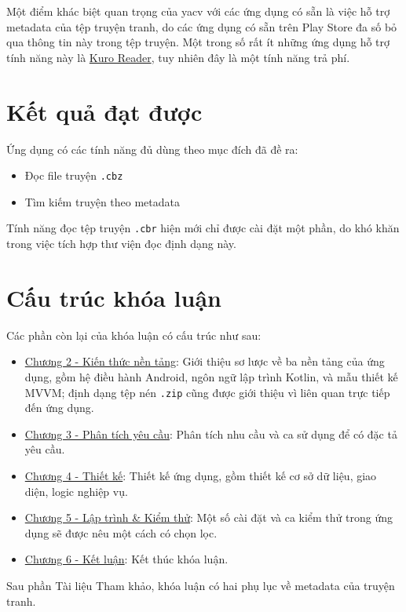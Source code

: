 \documentclass[../../thesis]{subfiles}
\begin{document}
Một điểm khác biệt quan trọng của yacv với các ứng dụng có sẵn là việc hỗ trợ
metadata của tệp truyện tranh, do các ứng dụng có sẵn trên Play Store đa số bỏ
qua thông tin này trong tệp truyện. Một trong số rất ít những ứng dụng hỗ trợ
tính năng này là \href{\KuroReader}{Kuro Reader}, tuy nhiên đây là một tính năng
trả phí.



\section{Kết quả đạt được}\label{sec:resulted-app}

Ứng dụng có các tính năng đủ dùng theo mục đích đã đề ra:

\begin{itemize}
    \item
        Đọc file truyện \texttt{.cbz}
    \item
        Tìm kiếm truyện theo metadata
\end{itemize}

Tính năng đọc tệp truyện \texttt{.cbr} hiện mới chỉ được cài đặt một
phần, do khó khăn trong việc tích hợp thư viện đọc định dạng này.



\section{Cấu trúc khóa luận}\label{sec:outline}

Các phần còn lại của khóa luận có cấu trúc như sau:

\begin{itemize}
    \item
        \hyperref[chap:fundamental]{Chương 2 - Kiến thức nền tảng}: Giới thiệu
        sơ lược về ba nền tảng của ứng dụng, gồm hệ điều hành Android, ngôn ngữ
        lập trình Kotlin, và mẫu thiết kế MVVM; định dạng tệp nén \texttt{.zip}
        cũng được giới thiệu vì liên quan trực tiếp đến ứng dụng.
    \item
        \hyperref[chap:requirements]{Chương 3 - Phân tích yêu cầu}: Phân tích
        nhu cầu và ca sử dụng để có đặc tả yêu cầu.
    \item
        \protect\hyperlink{P4-design}{Chương 4 - Thiết kế}: Thiết kế ứng dụng,
        gồm thiết kế cơ sở dữ liệu, giao diện, logic nghiệp vụ.
    \item
        \protect\hyperlink{P5-implementation}{Chương 5 - Lập trình \& Kiểm thử}:
        Một số cài đặt và ca kiểm thử trong ứng dụng sẽ được nêu một cách có
        chọn lọc.
    \item
        \protect\hyperlink{P6-comclusion}{Chương 6 - Kết luận}: Kết thúc khóa
        luận.
\end{itemize}

Sau phần Tài liệu Tham khảo, khóa luận có hai phụ lục về metadata của truyện
tranh.
\end{document}
